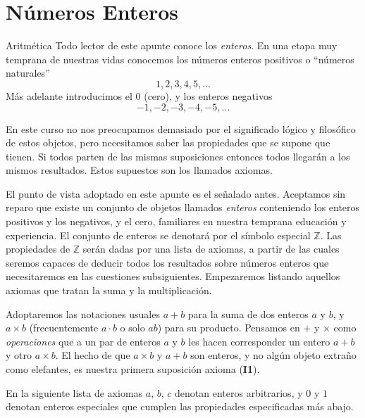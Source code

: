 
\chapter[Números Enteros]{Números Enteros}

\begin{section}{Aritmética}\label{1.1}
 Todo lector de este apunte conoce los \textit{enteros}. En una etapa muy temprana de nuestras vidas conocemos los números enteros positivos o ``números naturales'' $$1,2,3,4,5,\ldots$$ Más adelante introducimos el $0$ (cero), y los enteros negativos $$ -1,-2,-3,-4,-5,\ldots $$ 

En este curso no nos preocupamos demasiado por el significado lógico y filosófico de estos objetos, pero necesitamos saber las propiedades que se supone que tienen. Si todos parten de las mismas suposiciones entonces todos llegarán a los mismos resultados. Estos supuestos son los llamados axio\-mas.

El punto de vista adoptado en este apunte es el señalado antes. Aceptamos sin reparo que existe un conjunto de objetos llamados \textit{enteros} conteniendo los enteros positivos y los negativos, y el cero, familiares en nuestra temprana educación y experiencia. El conjunto de enteros se denotará por el símbolo especial ${\mathbb Z}$. Las propiedades de ${\mathbb Z}$ serán dadas por una lista de axiomas, a partir de las cuales seremos capaces de deducir todos los resultados sobre números enteros que necesitaremos en las cuestiones subsiguientes. Empezaremos listando aquellos axiomas que tratan la suma y la multiplicación.

Adoptaremos las notaciones usuales $a+b$ para la suma de dos enteros $a$ y $b$, y $a \times b$ (frecuentemente $a \cdot b$ o solo $ab$) para su producto. Pensamos en $+$ y $\times$ como \textit{operaciones} que a un par de enteros $a$ y $b$ les hacen corresponder un entero $a+b$ y otro $a\times b$. El hecho de que $a \times b$ y $a+b$ son enteros, y no algún objeto extra\~no como elefantes, es nuestra primera suposición axioma (\textbf{I1}).     

En la siguiente lista de axiomas $a$, $b$, $c$ denotan enteros arbitrarios, y $0$ y $1$ denotan enteros especiales que cumplen las propiedades especificadas más abajo.


\end{section}

